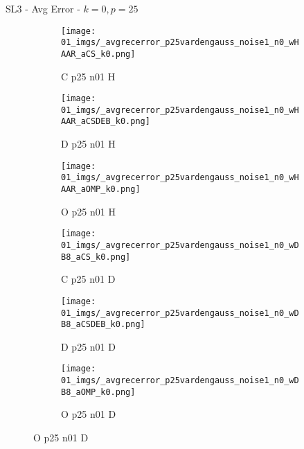 \begin{frame}{SL3 - Avg Error - $k=0,p=25$}{}
\begin{figure}
\begin{subfigure}{0.13\textwidth}
\texttt{[image: 01\_imgs/\_avgrecerror\_p25vardengauss\_noise1\_n0\_wHAAR\_aCS\_k0.png]}
\caption*{\tiny C p25 n01 H}
\end{subfigure}
\begin{subfigure}{0.13\textwidth}
\texttt{[image: 01\_imgs/\_avgrecerror\_p25vardengauss\_noise1\_n0\_wHAAR\_aCSDEB\_k0.png]}
\caption*{\tiny D p25 n01 H}
\end{subfigure}
\begin{subfigure}{0.13\textwidth}
\texttt{[image: 01\_imgs/\_avgrecerror\_p25vardengauss\_noise1\_n0\_wHAAR\_aOMP\_k0.png]}
\caption*{\tiny O p25 n01 H}
\end{subfigure}
\begin{subfigure}{0.13\textwidth}
\texttt{[image: 01\_imgs/\_avgrecerror\_p25vardengauss\_noise1\_n0\_wDB8\_aCS\_k0.png]}
\caption*{\tiny C p25 n01 D}
\end{subfigure}
\begin{subfigure}{0.13\textwidth}
\texttt{[image: 01\_imgs/\_avgrecerror\_p25vardengauss\_noise1\_n0\_wDB8\_aCSDEB\_k0.png]}
\caption*{\tiny D p25 n01 D}
\end{subfigure}
\begin{subfigure}{0.13\textwidth}
\texttt{[image: 01\_imgs/\_avgrecerror\_p25vardengauss\_noise1\_n0\_wDB8\_aOMP\_k0.png]}
\caption*{\tiny O p25 n01 D}
\end{subfigure}

\vspace{5pt}


\end{figure}
\end{frame}

